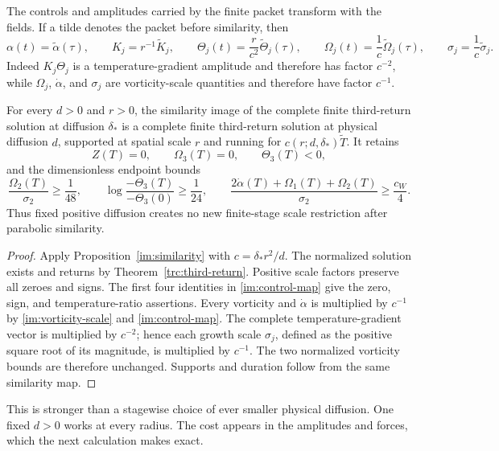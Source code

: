 The controls and amplitudes carried by the finite packet transform with
the fields.  If a tilde denotes the packet before similarity, then
\begin{equation}\label{im:control-map}
 \alpha(t)=\widetilde\alpha(\tau),\qquad
 K_j=r^{-1}\widetilde K_j,\qquad
 \Theta_j(t)=\frac r{c^2}\widetilde\Theta_j(\tau),\qquad
 \Omega_j(t)=\frac1c\widetilde\Omega_j(\tau),\qquad
 \sigma_j=\frac1c\widetilde\sigma_j .
\end{equation}
Indeed $K_j\Theta_j$ is a temperature-gradient amplitude and therefore
has factor $c^{-2}$, while $\Omega_j$, $\dot\alpha$, and $\sigma_j$ are
vorticity-scale quantities and therefore have factor $c^{-1}$.

\begin{theorem}\label{im:fixed-d-return}
For every $d>0$ and $r>0$, the similarity image of the complete finite
third-return solution at diffusion $\delta_*$ is a complete finite
third-return solution at physical diffusion $d$, supported at spatial
scale $r$ and running for
$c(r;d,\delta_*)\widetilde T$.  It retains
\[
 Z(T)=0,\qquad \Omega_3(T)=0,\qquad\Theta_3(T)<0,
\]
and the dimensionless endpoint bounds
\[
 \frac{\Omega_2(T)}{\sigma_2}\geq\frac1{48},\qquad
 \log\frac{-\Theta_3(T)}{-\Theta_3(0)}\geq\frac1{24},\qquad
 \frac{2\dot\alpha(T)+\Omega_1(T)+\Omega_2(T)}{\sigma_2}
 \geq\frac{c_W}{4}.
\]
Thus fixed positive diffusion creates no new finite-stage scale
restriction after parabolic similarity.
\end{theorem}

\begin{proof}
Apply Proposition~\ref{im:similarity} with
$c=\delta_*r^2/d$.  The normalized solution exists and returns by
Theorem~\ref{trc:third-return}.  Positive scale factors preserve all
zeroes and signs.  The first four identities in \eqref{im:control-map}
give the zero, sign, and temperature-ratio assertions.  Every vorticity
and $\dot\alpha$ is multiplied by $c^{-1}$ by
\eqref{im:vorticity-scale} and \eqref{im:control-map}.  The complete
temperature-gradient vector is multiplied by $c^{-2}$; hence each
growth scale $\sigma_j$, defined as the positive square root of its
magnitude, is multiplied by $c^{-1}$.  The two normalized vorticity
bounds are therefore unchanged.  Supports and duration follow from the
same similarity map.
\end{proof}

This is stronger than a stagewise choice of ever smaller physical
diffusion.  One fixed $d>0$ works at every radius.  The cost appears in
the amplitudes and forces, which the next calculation makes exact.

